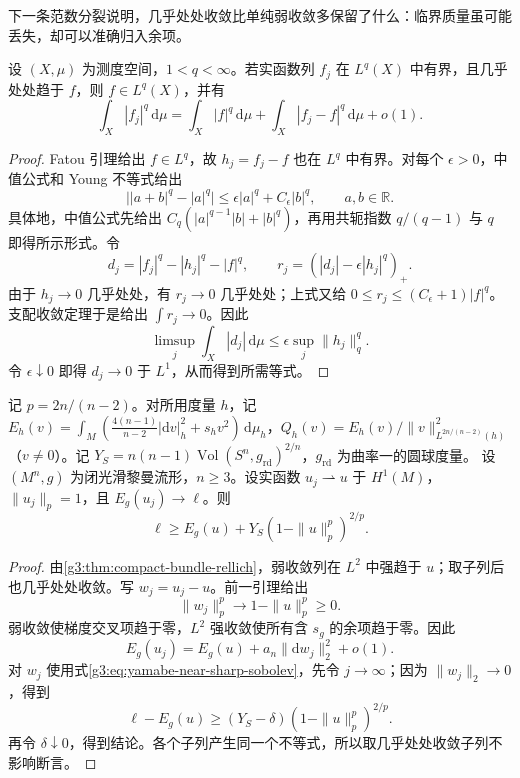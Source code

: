 下一条范数分裂说明，几乎处处收敛比单纯弱收敛多保留了什么：临界质量虽可能丢失，却可以准确归入余项。
\begin{lemma}\label{g3:lem:yamabe-norm-splitting}
	设 \((X,\mu)\) 为测度空间，\(1<q<\infty\)。若实函数列 \(f_j\) 在 \(L^q(X)\) 中有界，且几乎处处趋于 \(f\)，则 \(f\in L^q(X)\)，并有
	\begin{equation}\label{g3:eq:yamabe-norm-splitting}
		\int_X|f_j|^q\,\mathrm d\mu
		=\int_X|f|^q\,\mathrm d\mu
		+\int_X|f_j-f|^q\,\mathrm d\mu+o(1).
	\end{equation}
\end{lemma}
\begin{proof}
	Fatou 引理给出 \(f\in L^q\)，故 \(h_j=f_j-f\) 也在 \(L^q\) 中有界。对每个 \(\epsilon>0\)，中值公式和 Young 不等式给出
	\[
		\bigl||a+b|^q-|a|^q\bigr|
		\le\epsilon|a|^q+C_\epsilon|b|^q,
		\qquad a,b\in\mathbb R.
	\]
	具体地，中值公式先给出 \(C_q(|a|^{q-1}|b|+|b|^q)\)，再用共轭指数 \(q/(q-1)\) 与 \(q\) 即得所示形式。令
	\[
		d_j=|f_j|^q-|h_j|^q-|f|^q,
		\qquad r_j=(|d_j|-\epsilon|h_j|^q)_+.
	\]
	由于 \(h_j\to0\) 几乎处处，有 \(r_j\to0\) 几乎处处；上式又给 \(0\le r_j\le(C_\epsilon+1)|f|^q\)。支配收敛定理于是给出 \(\int r_j\to0\)。因此
	\[
		\limsup_j\int_X|d_j|\,\mathrm d\mu
		\le\epsilon\sup_j\|h_j\|_q^q.
	\]
	令 \(\epsilon\downarrow0\) 即得 \(d_j\to0\) 于 \(L^1\)，从而得到所需等式。
\end{proof}

\begin{lemma}\label{g3:lem:yamabe-energy-defect}
	记 \(p=2n/(n-2)\)。对所用度量 \(h\)，记 \(E_h(v)=\int_M(\tfrac{4(n-1)}{n-2}|\mathrm dv|_h^2+s_hv^2)\,\mathrm d\mu_h\)，\(Q_h(v)=E_h(v)/\|v\|_{L^{2n/(n-2)}(h)}^2\)（\(v\ne0\)）。记 \(Y_S=n(n-1)\operatorname{Vol}(S^n,g_{\mathrm{rd}})^{2/n}\)，\(g_{\mathrm{rd}}\) 为曲率一的圆球度量。
	设 \((M^n,g)\) 为闭光滑黎曼流形，\(n\ge3\)。设实函数 \(u_j\rightharpoonup u\) 于 \(H^1(M)\)，\(\|u_j\|_p=1\)，且 \(E_g(u_j)\to\ell\)。则
	\begin{equation}\label{g3:eq:yamabe-energy-defect}
		\ell\ge E_g(u)+Y_S(1-\|u\|_p^p)^{2/p}.
	\end{equation}
\end{lemma}
\begin{proof}
	由\cref{g3:thm:compact-bundle-rellich}，弱收敛列在 \(L^2\) 中强趋于 \(u\)；取子列后也几乎处处收敛。写 \(w_j=u_j-u\)。前一引理给出
	\[
		\|w_j\|_p^p\longrightarrow1-\|u\|_p^p\ge0.
	\]
	弱收敛使梯度交叉项趋于零，\(L^2\) 强收敛使所有含 \(s_g\) 的余项趋于零。因此
	\[
		E_g(u_j)=E_g(u)+a_n\|\mathrm dw_j\|_2^2+o(1).
	\]
	对 \(w_j\) 使用式\eqref{g3:eq:yamabe-near-sharp-sobolev}，先令 \(j\to\infty\)；因为 \(\|w_j\|_2\to0\)，得到
	\[
		\ell-E_g(u)\ge(Y_S-\delta)(1-\|u\|_p^p)^{2/p}.
	\]
	再令 \(\delta\downarrow0\)，得到结论。各个子列产生同一个不等式，所以取几乎处处收敛子列不影响断言。
\end{proof}


